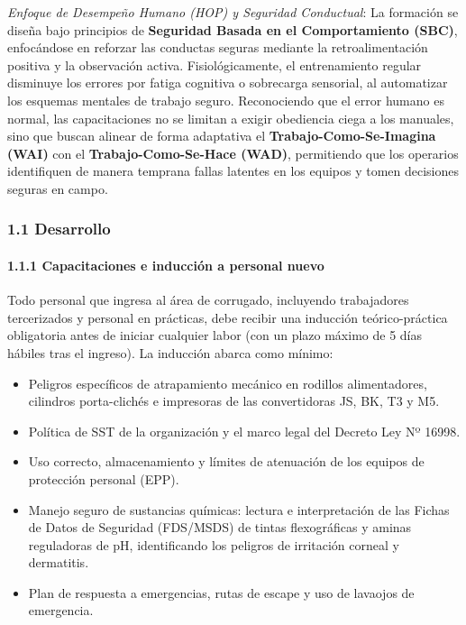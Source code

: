 \documentclass[11pt, letterpaper]{article}
\begin{document}
\textit{Enfoque de Desempeño Humano (HOP) y Seguridad Conductual}: La formación se diseña bajo principios de \textbf{Seguridad Basada en el Comportamiento (SBC)}, enfocándose en reforzar las conductas seguras mediante la retroalimentación positiva y la observación activa. Fisiológicamente, el entrenamiento regular disminuye los errores por fatiga cognitiva o sobrecarga sensorial, al automatizar los esquemas mentales de trabajo seguro. Reconociendo que el error humano es normal, las capacitaciones no se limitan a exigir obediencia ciega a los manuales, sino que buscan alinear de forma adaptativa el \textbf{Trabajo-Como-Se-Imagina (WAI)} con el \textbf{Trabajo-Como-Se-Hace (WAD)}, permitiendo que los operarios identifiquen de manera temprana fallas latentes en los equipos y tomen decisiones seguras en campo.

\subsubsection{1.1 Desarrollo}

\paragraph{1.1.1 Capacitaciones e inducción a personal nuevo}
Todo personal que ingresa al área de corrugado, incluyendo trabajadores tercerizados y personal en prácticas, debe recibir una inducción teórico-práctica obligatoria antes de iniciar cualquier labor (con un plazo máximo de 5 días hábiles tras el ingreso). La inducción abarca como mínimo:
\begin{itemize}
    \item Peligros específicos de atrapamiento mecánico en rodillos alimentadores, cilindros porta-clichés e impresoras de las convertidoras JS, BK, T3 y M5.
    \item Política de SST de la organización y el marco legal del Decreto Ley Nº 16998.
    \item Uso correcto, almacenamiento y límites de atenuación de los equipos de protección personal (EPP).
    \item Manejo seguro de sustancias químicas: lectura e interpretación de las Fichas de Datos de Seguridad (FDS/MSDS) de tintas flexográficas y aminas reguladoras de pH, identificando los peligros de irritación corneal y dermatitis.
    \item Plan de respuesta a emergencias, rutas de escape y uso de lavaojos de emergencia.
\end{itemize}
\end{document}
